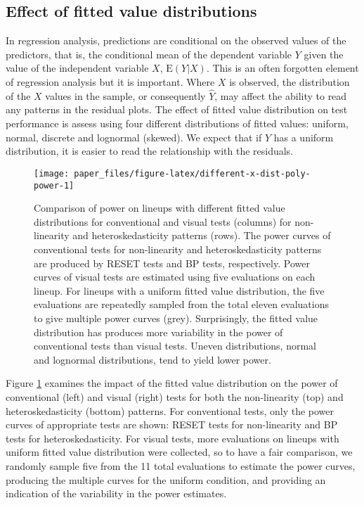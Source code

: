 \documentclass[]{interact}
\theoremstyle{plain}%
\theoremstyle{definition}
\theoremstyle{remark}
\begin{document}
\hypertarget{effect-of-fitted-value-distributions}{%
\subsection{Effect of fitted value
distributions}\label{effect-of-fitted-value-distributions}}

In regression analysis, predictions are conditional on the observed
values of the predictors, that is, the conditional mean of the dependent
variable \(Y\) given the value of the independent variable \(X\),
\(\text{E}(Y|X)\). This is an often forgotten element of regression
analysis but it is important. Where \(X\) is observed, the distribution
of the \(X\) values in the sample, or consequently \(\hat{Y}\), may
affect the ability to read any patterns in the residual plots. The
effect of fitted value distribution on test performance is assess using
four different distributions of fitted values: uniform, normal, discrete
and lognormal (skewed). We expect that if \(\hat{Y}\) has a uniform
distribution, it is easier to read the relationship with the residuals.

\begin{figure}[t!]

{\centering \texttt{[image: paper\_files/figure-latex/different-x-dist-poly-power-1]} 

}

\caption{Comparison of power on lineups with different fitted value distributions for conventional and visual tests (columns) for non-linearity and heteroskedasticity patterns (rows). The power curves of conventional tests for non-linearity and heteroskedasticity patterns are produced by RESET tests and BP tests, respectively. Power curves of visual tests are estimated using five evaluations on each lineup. For lineups with a uniform fitted value distribution, the five evaluations are repeatedly sampled from the total eleven evaluations to give multiple power curves (grey). Surprisingly, the fitted value distribution has produces more variability in the power of conventional tests than visual tests. Uneven distributions, normal and lognormal distributions, tend to yield lower power.}\label{fig:different-x-dist-poly-power}
\end{figure}

Figure \ref{fig:different-x-dist-poly-power} examines the impact of the
fitted value distribution on the power of conventional (left) and visual
(right) tests for both the non-linearity (top) and heteroskedasticity
(bottom) patterns. For conventional tests, only the power curves of
appropriate tests are shown: RESET tests for non-linearity and BP tests
for heteroskedasticity. For visual tests, more evaluations on lineups
with uniform fitted value distribution were collected, so to have a fair
comparison, we randomly sample five from the 11 total evaluations to
estimate the power curves, producing the multiple curves for the uniform
condition, and providing an indication of the variability in the power
estimates.
\end{document}
